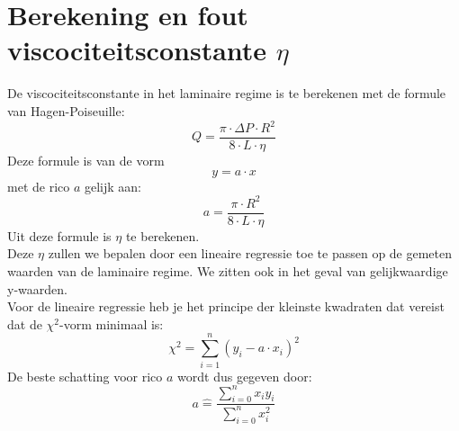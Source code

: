 \section{Berekening en fout viscociteitsconstante $\eta$}

De viscociteitsconstante in het laminaire regime is te berekenen met de formule van Hagen-Poiseuille:
\begin{equation}
    Q = \frac{\pi \cdot \Delta P \cdot R^2}{8 \cdot L \cdot \eta}
\end{equation}
Deze formule is van de vorm $$y=a\cdot x$$ met de rico $a$ gelijk aan: $$a = \frac{\pi \cdot R^2}{8 \cdot L \cdot \eta}$$
Uit deze formule is $\eta$ te berekenen.\\

Deze $\eta$ zullen we bepalen door een lineaire regressie toe te passen op de gemeten waarden van de laminaire regime.
We zitten ook in het geval van gelijkwaardige y-waarden.\\

Voor de lineaire regressie heb je het principe der kleinste kwadraten dat vereist
dat de $\chi ^2$-vorm minimaal is: 
\begin{equation}
    \chi ^2 = \sum\limits_{i=1}^n(y_i-a\cdot x_i)^2
\end{equation}
De beste schatting voor rico $a$ wordt dus gegeven door:
\begin{equation}
    a \hat{=} \frac{\sum\limits_{i=0}^n x_i  y_i}{\sum\limits_{i=0}^n x_i^2}
\end{equation}





